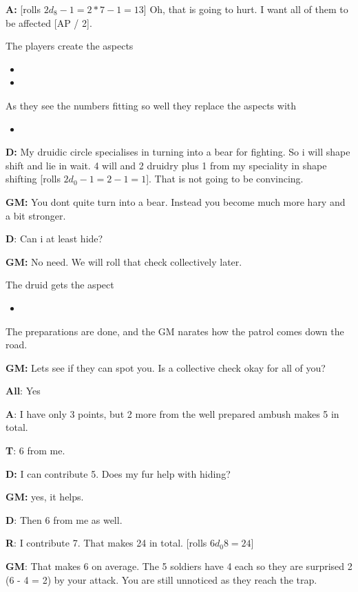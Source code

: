 \documentclass[11pt]{article}
\begin{document}
{\textbf{A:} {[}rolls \(2 d_8 - 1 = 2*7 -1 = 13\)] Oh, that is going to hurt. I want all of them to be affected [AP / 2].

The players create the aspects
\begin{itemize}
\item {}
\item {}
\end{itemize}
As they see the numbers fitting so well they replace the aspects with
\begin{itemize}
\item {}
\end{itemize}

\textbf{D:} My druidic circle specialises in turning into a bear for fighting. So i will shape shift and lie in wait. 4 will and 2 druidry plus 1 from my speciality in shape shifting [rolls \(2 d_0 - 1 = 2 - 1 = 1\)]. That is not going to be convincing.

\textbf{GM:} You dont quite turn into a bear. Instead you become much more hary and a bit stronger.

\textbf{D}: Can i at least hide?

\textbf{GM:} No need. We will roll that check collectively later.

The druid gets the aspect
\begin{itemize}
\item {}
\end{itemize}

The preparations are done, and the GM narates how the patrol comes down the road.

\textbf{GM:} Lets see if they can spot you. Is a collective check okay for all of you?

\textbf{All}: Yes

\textbf{A}: I have only 3 points, but 2 more from the well prepared ambush makes 5 in total.

\textbf{T}: 6 from me.

\textbf{D:} I can contribute 5. Does my fur help with hiding?

\textbf{GM:} yes, it helps.

\textbf{D}: Then 6 from me as well.

\textbf{R}: I contribute 7. That makes 24 in total. [rolls \(6 d_0 8 = 24\)]

\textbf{GM}: That makes 6 on average. The 5 soldiers have 4 each so they are surprised 2 (6 - 4 = 2) by your attack. You are still unnoticed as they reach the trap.

}
\end{document}
